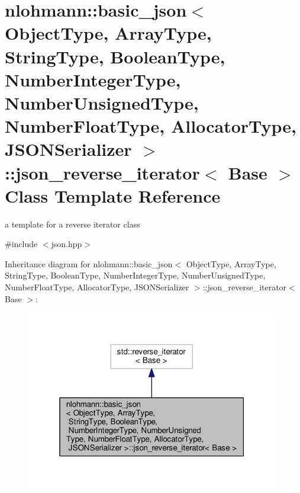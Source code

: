 \hypertarget{classnlohmann_1_1basic__json_1_1json__reverse__iterator}{}\section{nlohmann\+:\+:basic\+\_\+json$<$ Object\+Type, Array\+Type, String\+Type, Boolean\+Type, Number\+Integer\+Type, Number\+Unsigned\+Type, Number\+Float\+Type, Allocator\+Type, J\+S\+O\+N\+Serializer $>$\+:\+:json\+\_\+reverse\+\_\+iterator$<$ Base $>$ Class Template Reference}
\label{classnlohmann_1_1basic__json_1_1json__reverse__iterator}


a template for a reverse iterator class  




{\ttfamily \#include $<$json.\+hpp$>$}



Inheritance diagram for nlohmann\+:\+:basic\+\_\+json$<$ Object\+Type, Array\+Type, String\+Type, Boolean\+Type, Number\+Integer\+Type, Number\+Unsigned\+Type, Number\+Float\+Type, Allocator\+Type, J\+S\+O\+N\+Serializer $>$\+:\+:json\+\_\+reverse\+\_\+iterator$<$ Base $>$\+:\nopagebreak
\begin{figure}[H]
\begin{center}
\leavevmode
\includegraphics[width=313pt]{classnlohmann_1_1basic__json_1_1json__reverse__iterator__inherit__graph}
\end{center}
\end{figure}


